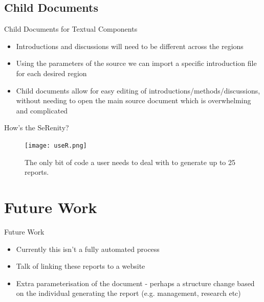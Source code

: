 \documentclass{beamer}
\begin{document}
          \subsection{Child Documents}
              \begin{frame}{Child Documents for Textual Components}
                  \begin{itemize}
                    \item Introductions and discussions will need to be different across the regions
                    \item Using the parameters of the source we can import a specific introduction file for each desired region
                    \item Child documents allow for easy editing of introductions/methods/discussions, without needing to open the main source document which is overwhelming and complicated
                  \end{itemize}
              \end{frame}

              \begin{frame}{How's the SeRenity?}
                  \begin{figure}
                      \centering
                      \texttt{[image: useR.png]}
                      \caption{The only bit of code a user needs to deal with to generate up to 25 reports.}
                  \end{figure}
              \end{frame}

      \section{Future Work}
        \begin{frame}{Future Work}
          \begin{itemize}
            \item Currently this isn't a fully automated process
            \item Talk of linking these reports to a website
            \item Extra parameterisation of the document - perhaps a structure change based on the individual generating the report (e.g. management, research etc)
          \end{itemize}
        \end{frame}

\appendix
\end{document}
